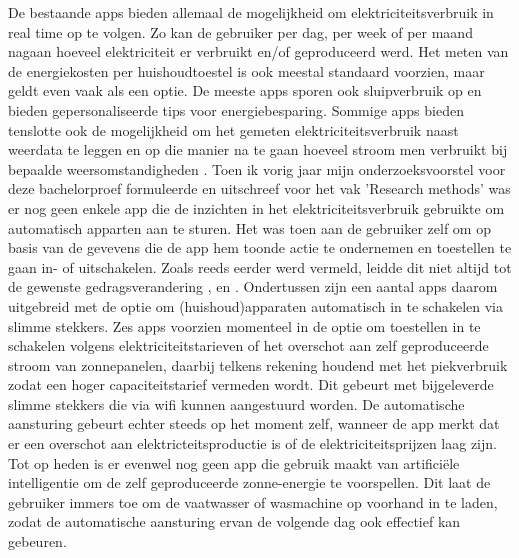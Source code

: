 De bestaande apps bieden allemaal de mogelijkheid om elektriciteitsverbruik in real time op te volgen. Zo kan de gebruiker per dag, per week of per maand nagaan hoeveel elektriciteit er verbruikt en/of geproduceerd werd. Het meten van de energiekosten per huishoudtoestel is ook meestal standaard voorzien, maar geldt even vaak als een optie. De meeste apps sporen ook sluipverbruik op en bieden gepersonaliseerde tips voor energiebesparing. Sommige apps bieden tenslotte ook de mogelijkheid om het gemeten elektriciteitsverbruik naast weerdata te leggen en op die manier na te gaan hoeveel stroom men verbruikt bij bepaalde weersomstandigheden \autocite{Deman2021}. Toen ik vorig jaar mijn onderzoeksvoorstel voor deze bachelorproef formuleerde en uitschreef voor het vak 'Research methods' was er nog geen enkele app die de inzichten in het elektriciteitsverbruik gebruikte om automatisch apparten aan te sturen. Het was toen aan de gebruiker zelf om op basis van de gevevens die de app hem toonde actie te ondernemen en toestellen te gaan in- of uitschakelen. Zoals reeds eerder werd vermeld, leidde dit niet altijd tot de gewenste gedragsverandering \autocite{Wemyss2019}, \autocite{Mack2019} en  \autocite{VREG2021}. Ondertussen zijn een aantal apps daarom uitgebreid met de optie om (huishoud)apparaten automatisch in te schakelen via slimme stekkers. Zes apps voorzien momenteel in de optie om toestellen in te schakelen volgens elektriciteitstarieven of het overschot aan zelf geproduceerde stroom van zonnepanelen, daarbij telkens rekening houdend met het piekverbruik zodat een hoger capaciteitstarief vermeden wordt. Dit gebeurt met bijgeleverde slimme stekkers die via wifi kunnen aangestuurd worden. De automatische aansturing gebeurt echter steeds op het moment zelf, wanneer de app merkt dat er een overschot aan elektricteitsproductie is of de elektriciteitsprijzen laag zijn. Tot op heden is er evenwel nog geen app die gebruik maakt van artificiële intelligentie om de zelf geproduceerde zonne-energie te voorspellen. Dit laat de gebruiker immers toe om de vaatwasser of wasmachine op voorhand  in te laden, zodat de automatische aansturing ervan de volgende dag ook effectief kan gebeuren. \\

\section{}%
\label{sec:voorspellingen maken met AI}

